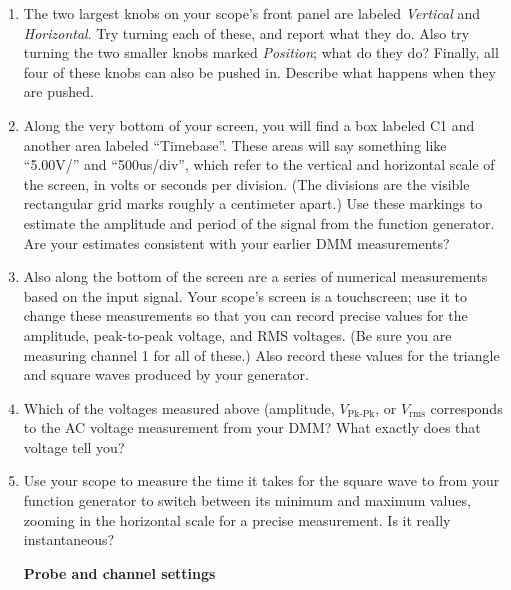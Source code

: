 \begin{enumerate}[wide]
\begin{newboxed}
The oscilloscope is very versatile and has many settings---which are probably set incorrectly for what you want it to do right now.  Call to your instructor for help so that you are at least able to see \textit{something} useful.
\end{newboxed}
\pagebreak[3]

\item The two largest knobs on your scope's front panel are labeled \textit{Vertical} and \textit{Horizontal}.  Try turning each of these, and report what they do.  Also try turning the two smaller knobs marked \textit{Position}; what do they do?  Finally, all four of these knobs can also be pushed in.  Describe what happens when they are pushed.

\item Along the very bottom of your screen, you will find a box labeled C1 and another area labeled ``Timebase''.  These areas will say something like ``5.00V/'' and ``500us/div'', which refer to the vertical and horizontal scale of the screen, in volts or seconds per division.  (The divisions are the visible rectangular grid marks roughly a centimeter apart.)  Use these markings to estimate the amplitude and period of the signal from the function generator.   Are your estimates consistent with your earlier DMM measurements?

\item Also along the bottom of the screen are a series of numerical measurements based on the input signal.  Your scope's screen is a touchscreen; use it to change these measurements so that you can record precise values for the amplitude, peak-to-peak voltage, and RMS voltages.  (Be sure you are measuring channel 1 for all of these.)  Also record these values for the triangle and square waves produced by your generator.

\item Which of the voltages measured above (amplitude, $V_\text{Pk-Pk}$, or $V_\text{rms}$ corresponds to the AC voltage measurement from your DMM?  What exactly does that voltage tell you? 

\item Use your scope to measure the time it takes for the square wave to from your function generator to switch between its minimum and maximum values, zooming in the horizontal scale for a precise measurement.  Is it really instantaneous?


\bigskip
\textbf{Probe and channel settings}


\end{enumerate}

